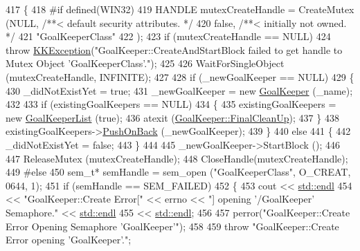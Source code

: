 \begin{DoxyCode}
417 \{
418 \textcolor{preprocessor}{#if  defined(WIN32)}
419   HANDLE  mutexCreateHandle = CreateMutex (NULL,                 \textcolor{comment}{/**< default security attributes. */}
420                                            \textcolor{keyword}{false},                \textcolor{comment}{/**< initially not owned.         */}
421                                            \textcolor{stringliteral}{"GoalKeeperClass"}
422                                           );
423   \textcolor{keywordflow}{if} (mutexCreateHandle == NULL)
424     \textcolor{keywordflow}{throw} \hyperlink{class_k_k_b_1_1_k_k_exception}{KKException}(\textcolor{stringliteral}{"GoalKeeper::CreateAndStartBlock  failed to get handle to Mutex Object
       'GoalKeeperClass'."});
425 
426   WaitForSingleObject (mutexCreateHandle, INFINITE);
427 
428   \textcolor{keywordflow}{if}  (\_newGoalKeeper == NULL)
429   \{
430     \_didNotExistYet = \textcolor{keyword}{true};
431     \_newGoalKeeper = \textcolor{keyword}{new} \hyperlink{class_k_k_b_1_1_goal_keeper}{GoalKeeper} (\_name);
432 
433     \textcolor{keywordflow}{if}  (existingGoalKeepers == NULL)
434     \{
435       existingGoalKeepers = \textcolor{keyword}{new} \hyperlink{class_k_k_b_1_1_goal_keeper_list}{GoalKeeperList} (\textcolor{keyword}{true});
436       atexit (\hyperlink{class_k_k_b_1_1_goal_keeper_aefe6575fd93ee87f4dba12607d1a1fcf}{GoalKeeper::FinalCleanUp});
437     \}
438     existingGoalKeepers->\hyperlink{class_k_k_b_1_1_k_k_queue_aa9fba4632b54268bf71ecb42dee0b575}{PushOnBack} (\_newGoalKeeper);
439   \}
440   \textcolor{keywordflow}{else}
441   \{
442     \_didNotExistYet = \textcolor{keyword}{false};
443   \}
444 
445   \_newGoalKeeper->StartBlock ();
446 
447   ReleaseMutex (mutexCreateHandle);
448   CloseHandle(mutexCreateHandle);
449 \textcolor{preprocessor}{#else}
450   sem\_t*  semHandle = sem\_open (\textcolor{stringliteral}{"GoalKeeperClass"}, O\_CREAT, 0644, 1);
451   \textcolor{keywordflow}{if}  (semHandle == SEM\_FAILED)
452   \{
453     cout << \hyperlink{namespace_k_k_b_ad1f50f65af6adc8fa9e6f62d007818a8}{std::endl}
454          << \textcolor{stringliteral}{"GoalKeeper::Create  Error["} << errno << \textcolor{stringliteral}{"] opening '/GoalKeeper' Semaphore."} << 
      \hyperlink{namespace_k_k_b_ad1f50f65af6adc8fa9e6f62d007818a8}{std::endl}
455          << \hyperlink{namespace_k_k_b_ad1f50f65af6adc8fa9e6f62d007818a8}{std::endl};
456 
457     perror(\textcolor{stringliteral}{"GoalKeeper::Create   Error Opening Semaphore  'GoalKeeper'"});
458 
459     \textcolor{keywordflow}{throw} \textcolor{stringliteral}{"GoalKeeper::Create    Error opening 'GoalKeeper'."};

\end{DoxyCode}
